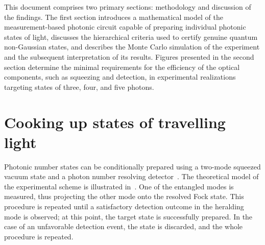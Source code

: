 \documentclass{article}
\begin{document}
This document comprises two primary sections:  methodology and discussion of the findings. The first section introduces a mathematical model of the measurement-based photonic circuit capable of preparing individual photonic states of light, discusses the hierarchical criteria used to certify genuine quantum non-Gaussian states, and describes the Monte Carlo simulation of the experiment and the subsequent interpretation of its results. Figures presented in the second section determine the minimal requirements for the efficiency of the optical components, such as squeezing and detection, in experimental realizations targeting states of three, four, and five photons.


%

\section{Cooking up states of travelling light}

Photonic number states can be conditionally prepared using a two-mode squeezed vacuum state and a photon number resolving detector~\cite{yukawa2013a,yoshikawa2018,tiedau2019,provaznik2020}. The theoretical model of the experimental scheme is illustrated in~. One of the entangled modes is measured, thus projecting the other mode onto the resolved Fock state. This procedure is repeated until a satisfactory detection outcome in the heralding mode is observed; at this point, the target state is successfully prepared. In the case of an unfavorable detection event, the state is discarded, and the whole procedure is repeated.
\end{document}
